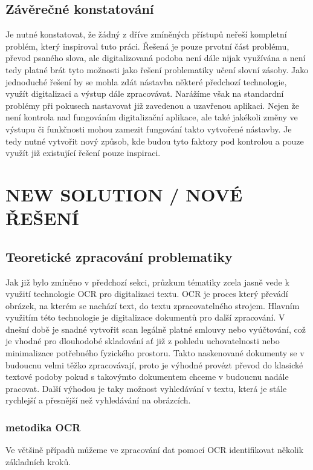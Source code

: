 \documentclass[journal]{IEEEtran}
\begin{document}
\subsection{Závěrečné konstatování}
Je nutné konstatovat, že žádný z dříve zmíněných přístupů neřeší  kompletní problém, který inspiroval tuto práci. Řešená je pouze  prvotní část problému, převod psaného slova, ale digitalizovaná podoba není dále nijak využívána a není tedy platné brát tyto možnosti jako řešení problematiky učení slovní zásoby.
Jako jednoduché řešení by se mohla zdát nástavba některé předchozí technologie, využít digitalizaci a výstup dále zpracovávat. Narážíme však na standardní problémy při pokusech nastavovat již zavedenou a uzavřenou aplikaci. Nejen že není  kontrola nad fungováním digitalizační aplikace, ale také jakékoli změny ve výstupu či funkčnosti mohou zamezit fungování takto vytvořené nástavby.
Je tedy nutné vytvořit nový způsob, kde budou tyto faktory pod kontrolou a pouze využít již existující řešení pouze inspiraci.

\section{NEW SOLUTION / NOVÉ ŘEŠENÍ}

\subsection{Teoretické zpracování problematiky}
Jak již bylo zmíněno v předchozí sekci, průzkum tématiky zcela jasně vede k využití technologie \ac{OCR} pro digitalizaci textu.
\ac{OCR} je proces který převádí obrázek, na kterém se nachází text, do textu zpracovatelného strojem.
Hlavním využitím této technologie je digitalizace dokumentů pro další zpracování. V dnešní době je snadné vytvořit scan legálně platné smlouvy nebo vyúčtování, což je vhodné pro dlouhodobé skladování ať již z pohledu uchovatelnosti nebo minimalizace potřebného fyzického prostoru.
Takto naskenované dokumenty se v budoucnu velmi těžko zpracovávají, proto je výhodné provézt převod do klasické textové podoby pokud s takovýmto dokumentem chceme v budoucnu nadále pracovat. Další výhodou je taky možnost vyhledávání v textu, která je stále rychlejší a přesnější než vyhledávání na obrázcích.\cite{amazon_ocr}

\subsubsection{metodika OCR}
Ve většině případů můžeme ve zpracování dat pomocí \ac{OCR} identifikovat několik základních kroků.\cite{amazon_ocr}
\end{document}
